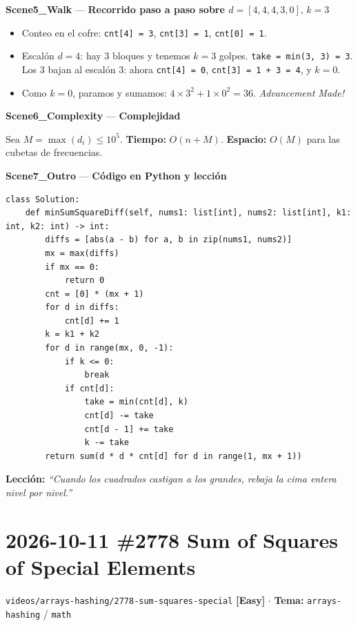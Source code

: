 \documentclass[letterpaper,10pt]{article}
\newcommand{\scene}[2]{\noindent\textbf{\textcolor{mcaqua}{#1}} --- \textbf{#2}\par\vspace{1pt}}
\newcommand{\folder}[1]{\texttt{\textcolor{mcgreen}{#1}}}
\newcommand{\badge}[2]{\textbf{\textcolor{#1}{[#2]}}}
\begin{document}
\begin{shaded}
\scene{Scene5\_Walk}{Recorrido paso a paso sobre $d = [4, 4, 4, 3, 0],\, k = 3$}
\begin{itemize}\setlength{\itemsep}{1pt}
  \item Conteo en el cofre: \texttt{cnt[4] = 3}, \texttt{cnt[3] = 1}, \texttt{cnt[0] = 1}.
  \item Escal\'on $d = 4$: hay $3$ bloques y tenemos $k = 3$ golpes. \texttt{take = min(3, 3) = 3}. Los $3$ bajan al escal\'on $3$: ahora \texttt{cnt[4] = 0}, \texttt{cnt[3] = 1 + 3 = 4}, y $k = 0$.
  \item Como $k = 0$, paramos y sumamos: $4 \times 3^2 + 1 \times 0^2 = 36$. \textit{Advancement Made!}
\end{itemize}

\scene{Scene6\_Complexity}{Complejidad}
Sea $M = \max(d_i) \le 10^5$. \textbf{Tiempo:} $O(n + M)$. \quad \textbf{Espacio:} $O(M)$ para las cubetas de frecuencias.
\end{shaded}

\scene{Scene7\_Outro}{C\'odigo en Python y lecci\'on}
\begin{Verbatim}[frame=single,fontsize=\small]
class Solution:
    def minSumSquareDiff(self, nums1: list[int], nums2: list[int], k1: int, k2: int) -> int:
        diffs = [abs(a - b) for a, b in zip(nums1, nums2)]
        mx = max(diffs)
        if mx == 0:
            return 0
        cnt = [0] * (mx + 1)
        for d in diffs:
            cnt[d] += 1
        k = k1 + k2
        for d in range(mx, 0, -1):
            if k <= 0:
                break
            if cnt[d]:
                take = min(cnt[d], k)
                cnt[d] -= take
                cnt[d - 1] += take
                k -= take
        return sum(d * d * cnt[d] for d in range(1, mx + 1))
\end{Verbatim}
\textbf{Lecci\'on:} \textit{``Cuando los cuadrados castigan a los grandes, rebaja la cima entera nivel por nivel.''}

\newpage

\section{2026-10-11 \textbar{} \#2778 Sum of Squares of Special Elements}
\folder{videos/arrays-hashing/2778-sum-squares-special} \hfill \badge{mcgreen}{Easy} $\cdot$ \textbf{Tema:} \texttt{arrays-hashing} / \texttt{math}
\end{document}
